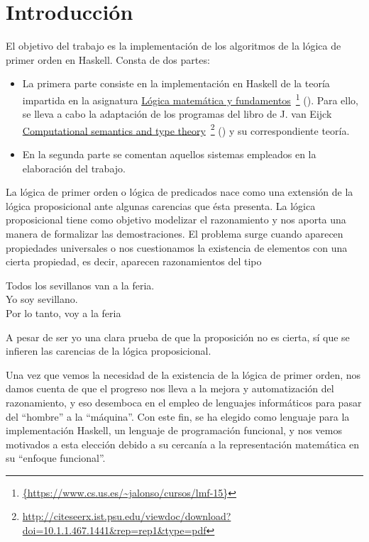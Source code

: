 \chapter*{Introducción}

El objetivo del trabajo es la implementación de los algoritmos de la lógica de
primer orden en Haskell. Consta de dos partes:

\begin{itemize}
\item La primera parte consiste en la implementación en Haskell de la teoría
  impartida en la asignatura
  \href{https://www.cs.us.es/~jalonso/cursos/lmf-15} 
       {Lógica matemática y fundamentos}\
  \footnote{\url{{https://www.cs.us.es/~jalonso/cursos/lmf-15}}}
  (\cite{Alonso-15a}). Para ello, se lleva a cabo la adaptación de los programas del libro de
  J. van Eijck 
  \href{http://citeseerx.ist.psu.edu/viewdoc/download?doi=10.1.1.467.1441&rep=rep1&type=pdf}
       {Computational semantics and type theory}\
  \footnote{\url{http://citeseerx.ist.psu.edu/viewdoc/download?doi=10.1.1.467.1441&rep=rep1&type=pdf}}
  (\cite{Eijck-03}) y su correspondiente teoría. 

\item En la segunda parte se comentan aquellos sistemas empleados en la elaboración del
  trabajo.
 
\end{itemize}

La lógica de primer orden o lógica de predicados nace como una extensión de la lógica proposicional ante algunas carencias que ésta presenta. La lógica proposicional tiene como objetivo modelizar el razonamiento y nos aporta una manera de formalizar las demostraciones. El problema surge cuando aparecen propiedades universales o nos cuestionamos la existencia de elementos con una cierta propiedad, es decir, aparecen razonamientos del tipo
\begin{center}
  Todos los sevillanos van a la feria. \\
  Yo soy sevillano.\\
  Por lo tanto, voy a la feria
\end{center}
A pesar de ser yo una clara prueba de que la proposición no es cierta, sí que se infieren las carencias de la lógica proposicional.

Una vez que vemos la necesidad de la existencia de la lógica de primer orden, nos damos cuenta de que el progreso nos lleva a la mejora y automatización del razonamiento, y eso desemboca en el empleo de lenguajes informáticos para pasar del ``hombre'' a la ``máquina''. Con este fin, se ha elegido como lenguaje para la implementación Haskell, un lenguaje de programación funcional, y nos vemos motivados a esta elección debido a su cercanía a la representación matemática en su ``enfoque funcional''.

